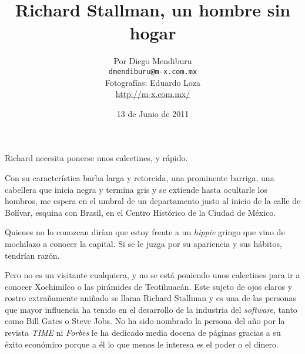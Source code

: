 \documentclass[oneside,twocolumn]{article}
\begin{document}
\title{\bf Richard Stallman, un hombre sin hogar}
\author{Por Diego Mendiburu \\
\texttt{dmendiburu@m-x.com.mx} \\
Fotografías: Eduardo Loza \\
\url{http://m-x.com.mx/}}
\date{13 de Junio de 2011}

Richard necesita ponerse unos calcetines, y rápido.

Con su característica barba larga y retorcida, una prominente barriga, una cabellera que inicia negra y
termina gris y se extiende hasta ocultarle los hombros, me espera en el umbral de un departamento justo al
inicio de la calle de Bolívar, esquina con Brasil, en el Centro Histórico de la Ciudad de México.

Quienes no lo conozcan dirían que estoy frente a un \emph{hippie} gringo que vino de mochilazo a conocer la 
capital. Si se le juzga por su apariencia y sus hábitos, tendrían razón.

Pero no es un visitante cualquiera, y no se está poniendo unos calcetines para ir a conocer Xochimilco 
o las pirámides de Teotihuacán. Este sujeto de ojos claros y rostro extrañamente aniñado se llama Richard 
Stallman y es una de las personas que mayor influencia ha tenido en el desarrollo de la industria del 
\emph{software}, tanto como Bill Gates o Steve Jobs. No ha sido nombrado la persona del año por la revista
\emph{TIME} ni \emph{Forbes} le ha dedicado media docena de páginas gracias a su éxito económico porque 
a él lo que menos le interesa es el poder o el dinero.
\end{document}
